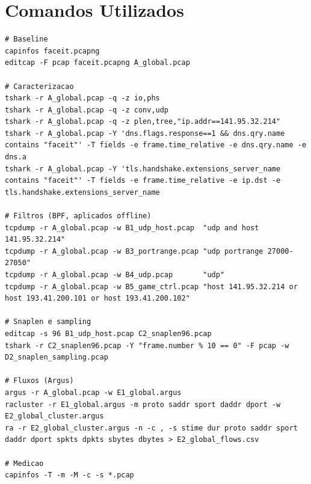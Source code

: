 \documentclass[11pt, a4paper]{article}
\begin{document}
\section{Comandos Utilizados}
\begin{lstlisting}
# Baseline
capinfos faceit.pcapng
editcap -F pcap faceit.pcapng A_global.pcap

# Caracterizacao
tshark -r A_global.pcap -q -z io,phs
tshark -r A_global.pcap -q -z conv,udp
tshark -r A_global.pcap -q -z plen,tree,"ip.addr==141.95.32.214"
tshark -r A_global.pcap -Y 'dns.flags.response==1 && dns.qry.name contains "faceit"' -T fields -e frame.time_relative -e dns.qry.name -e dns.a
tshark -r A_global.pcap -Y 'tls.handshake.extensions_server_name contains "faceit"' -T fields -e frame.time_relative -e ip.dst -e tls.handshake.extensions_server_name

# Filtros (BPF, aplicados offline)
tcpdump -r A_global.pcap -w B1_udp_host.pcap  "udp and host 141.95.32.214"
tcpdump -r A_global.pcap -w B3_portrange.pcap "udp portrange 27000-27050"
tcpdump -r A_global.pcap -w B4_udp.pcap       "udp"
tcpdump -r A_global.pcap -w B5_game_ctrl.pcap "host 141.95.32.214 or host 193.41.200.101 or host 193.41.200.102"

# Snaplen e sampling
editcap -s 96 B1_udp_host.pcap C2_snaplen96.pcap
tshark -r C2_snaplen96.pcap -Y "frame.number % 10 == 0" -F pcap -w D2_snaplen_sampling.pcap

# Fluxos (Argus)
argus -r A_global.pcap -w E1_global.argus
racluster -r E1_global.argus -m proto saddr sport daddr dport -w E2_global_cluster.argus
ra -r E2_global_cluster.argus -n -c , -s stime dur proto saddr sport daddr dport spkts dpkts sbytes dbytes > E2_global_flows.csv

# Medicao
capinfos -T -m -M -c -s *.pcap
\end{lstlisting}
\end{document}
